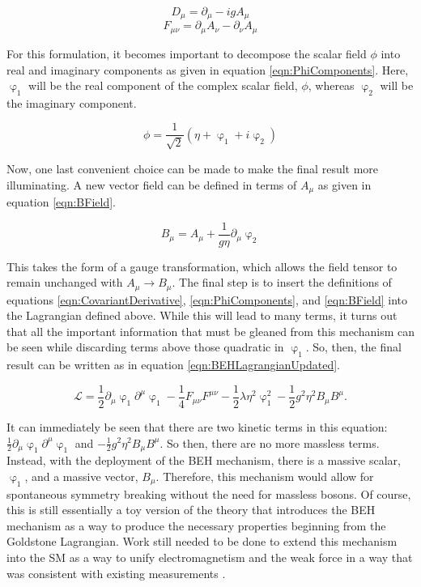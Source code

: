 \documentclass[12pt]{ucsddissertation}
\begin{document}
\begin{equation}\label{eqn:CovariantDerivative}
    D_{\mu} = \partial_{\mu} - i g A_{\mu} 
\end{equation}
\begin{equation}\label{eqn:FieldTensor}
    F_{\mu \nu} = \partial_{\mu} A_{\nu} - \partial_{\nu} A_{\mu}
\end{equation}

For this formulation, it becomes important to decompose the scalar field $\phi$ into real and imaginary components as given in equation \ref{eqn:PhiComponents}. Here, $\upvarphi_1$ will be the real component of the complex scalar field, $\phi$, whereas $\upvarphi_2$ will be the imaginary component. 

\begin{equation}\label{eqn:PhiComponents}
    \phi = \frac{1}{\sqrt{2}}(\eta + \upvarphi_1 + i \upvarphi_2)
\end{equation}

Now, one last convenient choice can be made to make the final result more illuminating. A new vector field can be defined in terms of $A_{\mu}$ as given in equation \ref{eqn:BField}.

\begin{equation}\label{eqn:BField}
    B_{\mu} = A_{\mu} + \frac{1}{g \eta} \partial_{\mu} \upvarphi_2
\end{equation}

This takes the form of a gauge transformation, which allows the field tensor to remain unchanged with $A_{\mu} \rightarrow B_{\mu}$. The final step is to insert the definitions of equations \ref{eqn:CovariantDerivative}, \ref{eqn:PhiComponents}, and \ref{eqn:BField} into the Lagrangian defined above. While this will lead to many terms, it turns out that all the important information that must be gleaned from this mechanism can be seen while discarding terms above those quadratic in $\upvarphi_1$. So, then, the final result can be written as in equation \ref{eqn:BEHLagrangianUpdated}.

\begin{equation}\label{eqn:BEHLagrangianUpdated}
    \mathcal{L} = \frac{1}{2}\partial_{\mu} \upvarphi_1 \partial^{\mu} \upvarphi_1 - \frac{1}{4}F_{\mu\nu}F^{\mu\nu} - \frac{1}{2}\lambda \eta^2 \upvarphi^{2}_{1} - \frac{1}{2} g^2 \eta^2 B_{\mu} B^{\mu}.
\end{equation}

It can immediately be seen that there are two kinetic terms in this equation: $\frac{1}{2}\partial_{\mu} \upvarphi_1 \partial^{\mu} \upvarphi_1$ and $- \frac{1}{2} g^2 \eta^2 B_{\mu} B^{\mu}$. So then, there are no more massless terms. Instead, with the deployment of the BEH mechanism, there is a massive scalar, $\upvarphi_1$, and a massive vector, $B_{\mu}$. Therefore, this mechanism would allow for spontaneous symmetry breaking without the need for massless bosons. Of course, this is still essentially a toy version of the theory that introduces the BEH mechanism as a way to produce the necessary properties beginning from the Goldstone Lagrangian. Work still needed to be done to extend this mechanism into the SM as a way to unify electromagnetism and the weak force in a way that was consistent with existing measurements \cite{SMOverview}.
\end{document}
